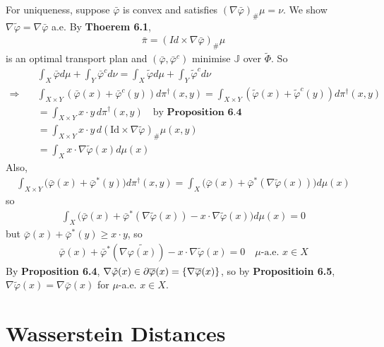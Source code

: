\documentclass[12pt,a4paper]{article}
\newenvironment{proof}
{\begin{changemargin}{1cm}{0.5cm} 
	}%
	{\end{changemargin}
}
\newenvironment{p}
{\begin{proof} 
	}%
	{\end{proof}
}
\begin{document}
\begin{p}
For uniqueness, suppose $\bar{\varphi}$ is convex and satisfies $(\nabla \bar{\varphi})_{\#}\mu =\nu$. We show $\nabla \tilde{\varphi} = \nabla \bar{\varphi}$ a.e. By \textbf{Thoerem 6.1},
\begin{align*}
\bar{\pi} = (Id \times \nabla \bar{\varphi})_{\#} \mu
\end{align*}
is an optimal transport plan and $(\bar{\varphi}, \bar{\varphi}^c)$ minimise $\mathbb{J}$ over $\tilde{\Phi}$. So
\begin{align*}
& \int_X \bar{\varphi} d\mu + \int_{Y}\bar{\varphi}^c d\nu = \int_X \tilde{\varphi} d\mu + \int_Y \tilde{\varphi}^c d\nu \\
\Rightarrow \quad & \int_{X\times Y} (\bar{\varphi}(x) + \bar{\varphi}^c (y)) d\pi^{\dagger}(x,y) = \int_{X\times Y} (\tilde{\varphi}(x) + \tilde{\varphi}^c (y)) d\pi^{\dagger}(x,y) \\
&=\int_{X\times Y} x\cdot y \, d\pi^{\dagger} (x,y)  \quad \text{by } \textbf{Proposition 6.4}\\
&=\int_{X\times Y} x\cdot y \, d(\text{Id} \times \nabla \tilde{\varphi})_{\#} \mu(x,y)\\
&=\int_X x\cdot \nabla \tilde{\varphi}(x) d\mu (x)
\end{align*}
Also,
\begin{align*}
\int_{X\times Y} \big( \bar{\varphi}(x) +\bar{\varphi}^*(y) \big) d\pi^{\dagger}(x,y) = \int_X  \big( \bar{\varphi}(x) + \bar{\varphi}^*(\nabla \tilde{\varphi}(x)) \big) d\mu(x)
\end{align*}
so
\begin{align*}
\int_X \big( \bar{\varphi}(x) + \bar{\varphi}^*(\nabla \tilde{\varphi}(x)) - x\cdot \nabla \tilde{\varphi}(x)\big)d\mu(x)=0
\end{align*}
but $\bar{\varphi}(x) + \bar{\varphi}^*(y) \geq x\cdot y$, so
\begin{align*}
\bar{\varphi}(x) + \bar{\varphi}^*(\nabla \tilde{\varphi(x)}) - x\cdot \nabla \tilde{\varphi}(x) =0 \quad \mu\text{-a.e. } x\in X
\end{align*}
By \textbf{Proposition 6.4}, $\nabla \tilde{\varphi}(x) \in \partial \overline{\varphi}(x) = \{ \nabla \overline{\varphi}(x)\}$, so by \textbf{Propositioin 6.5}, $\nabla \tilde{\varphi}(x) = \nabla \bar{\varphi}(x)$ for $\mu$-a.e. $x\in X$.

\eop 
\end{p}

\section{Wasserstein Distances}
\end{document}
